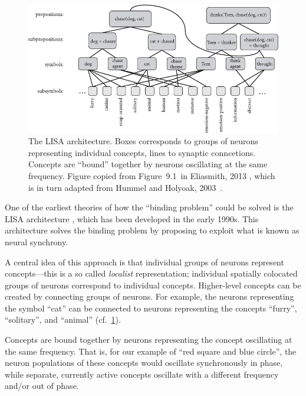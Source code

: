 \documentclass[10pt,letterpaper,oneside]{article}
\begin{document}
\begin{figure}
	\centering
	\includegraphics[width=\textwidth]{media/eliasmith_2013_lisa.pdf}
	\caption{The LISA architecture. Boxes corresponds to groups of neurons representing individual concepts, lines to synaptic conncetions. Concepts are \enquote{bound} together by neurons oscillating at the same frequency. Figure copied from Figure~9.1~in Eliasmith, 2013 \cite{eliasmith2013how}, which is in turn adapted from Hummel and Holyoak, 2003~\cite{hummel2003symbolicconnectionist}.}
	\label{fig:eliasmith_2013_lisa.pdf}
\end{figure}

One of the earliest theories of how the \enquote{binding problem} could be solved is the LISA architecture \cite{hummel2003symbolicconnectionist}, which has been developed in the early 1990s. This architecture solves the binding problem by proposing to exploit what is known as neural synchrony.

A central idea of this approach is that individual groups of neurons represent concepts---this is a so called \emph{localist} representation; individual spatially colocated groups of neurons correspond to individual concepts. Higher-level concepts can be created by connecting groups of neurons. For example, the neurons representing the symbol \enquote{cat} can be connected to neurons representing the concepts \enquote{furry}, \enquote{solitary}, and \enquote{animal} (cf.~\cref{fig:eliasmith_2013_lisa.pdf}).

Concepts are bound together by neurons representing the concept oscillating at the same frequency. That is, for our example of \enquote{red square and blue circle}, the neuron populations of these concepts would oscillate synchronously in phase, while separate, currently active concepts oscillate with a different frequency and/or out of phase.

\newpage
\end{document}
